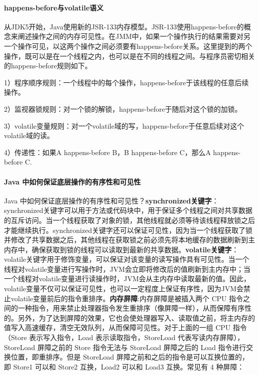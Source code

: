 \documentclass[../../../interview-questions.tex]{subfiles}
\begin{document}
\paragraph{happens-before与volatile语义}

从JDK5开始，Java使用新的JSR-133内存模型。JSR-133使用happens-before的概念来阐述操作之间的内存可见性。在JMM中，如果一个操作执行的结果需要对另一个操作可见，以这两个操作之间必须要有happens-before关系。这里提到的两个操作，既可以是在一个线程之内，也可以是在不同的线程之间。与程序员密切相关的happens-before规则如下。

1）程序顺序规则：一个线程中的每个操作，happens-before于该线程的任意后续操作。

2）监视器锁规则：对一个锁的解锁，happens-before于随后对这个锁的加锁。

3）volatile变量规则：对一个volatile域的写，happens-before于任意后续对这个volatile域的读。

4）传递性：如果A happens-before B，B happens-before C，那么A happens-before C.

\paragraph{Java 中如何保证底层操作的有序性和可见性}

Java 中如何保证底层操作的有序性和可见性？\textbf{synchronized关键字}：synchronized关键字可以用于方法或代码块中，用于保证多个线程之间对共享数据的互斥访问。当一个线程获取了对象的锁，其他线程就必须等待该线程释放锁之后才能继续执行。synchronized关键字还可以保证可见性，因为当一个线程获取了锁并修改了共享数据之后，其他线程在获取锁之前必须先将本地缓存的数据刷新到主内存中，确保获取到锁的线程可以读取到最新的共享数据。\textbf{volatile关键字}：volatile关键字用于修饰变量，可以保证对该变量的读写操作具有可见性。当一个线程对volatile变量进行写操作时，JVM会立即将修改后的值刷新到主内存中；当一个线程对volatile变量进行读操作时，JVM会从主内存中读取最新的值。因此，volatile变量不仅可以保证可见性，也可以一定程度上保证有序性，因为JVM会禁止volatile变量前后的指令重排序。\textbf{内存屏障}:内存屏障是被插入两个 CPU 指令之间的一种指令，用来禁止处理器指令发生重排序（像屏障一样），从而保障有序性的。另外，为了达到屏障的效果，它也会使处理器写入、读取值之前，将主内存的值写入高速缓存，清空无效队列，从而保障可见性。对于上面的一组 CPU 指令（Store 表示写入指令，Load 表示读取指令，StoreLoad 代表写读内存屏障），StoreLoad 屏障之前的 Store 指令无法与 StoreLoad 屏障之后的 Load 指令进行交换位置，即重排序。但是 StoreLoad 屏障之前和之后的指令是可以互换位置的，即 Store1 可以和 Store2 互换，Load2 可以和 Load3 互换。常见有 4 种屏障：
\end{document}
